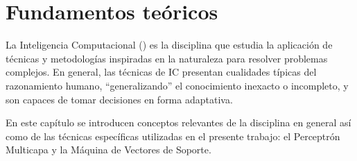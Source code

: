 %
%
%
%
\chapter{Fundamentos teóricos}
%
La Inteligencia Computacional () es la disciplina que estudia la
aplicación de técnicas y metodologías inspiradas en la naturaleza para
resolver problemas complejos.
En general, las técnicas de IC presentan
cualidades típicas del razonamiento humano, ``generalizando'' el
conocimiento inexacto o incompleto, y son capaces de tomar decisiones
en forma adaptativa.

En este capítulo se introducen conceptos relevantes de la disciplina
en general así como de las técnicas específicas utilizadas en el
presente trabajo: el Perceptrón Multicapa y la Máquina de Vectores de
Soporte.
